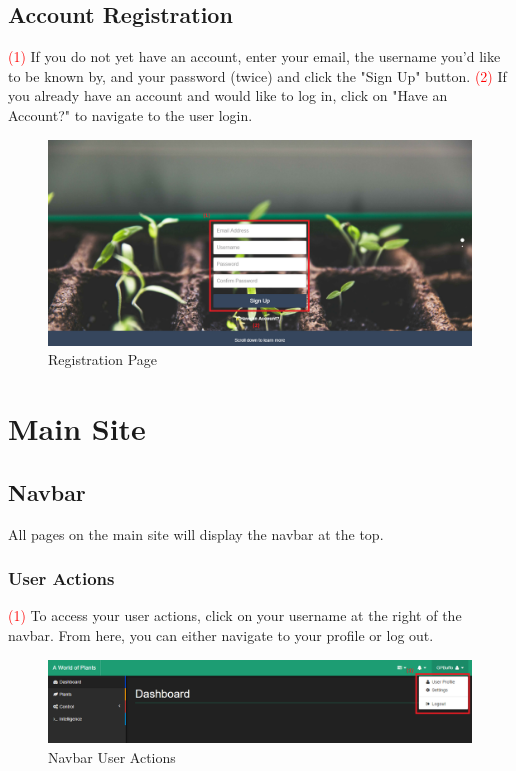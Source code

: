 \documentclass{article}
\begin{document}
	\subsection{Account Registration}
		\textcolor{red}{(1)} If you do not yet have an account, enter your email, the username you'd like to be known by, and your password (twice) and click the "Sign Up" button.
		\newline
		\textcolor{red}{(2)} If you already have an account and would like to log in, click on "Have an Account?" to navigate to the user login.
		\newline
		\begin{figure}[H]
			\includegraphics[width=\textwidth]{../images/UserManual/registration.PNG}
			\caption{Registration Page}
		\end{figure}
		
\section{Main Site}
	\subsection{Navbar}
	All pages on the main site will display the navbar at the top.
		\subsubsection{User Actions}
		\textcolor{red}{(1)} To access your user actions, click on your username at the right of the navbar. From here, you can either navigate to your profile or log out.
		\begin{figure}[H]
			\includegraphics[width=\textwidth]{../images/UserManual/navbar-user-actions.PNG}
			\caption{Navbar User Actions}
		\end{figure}
		
\end{document}
